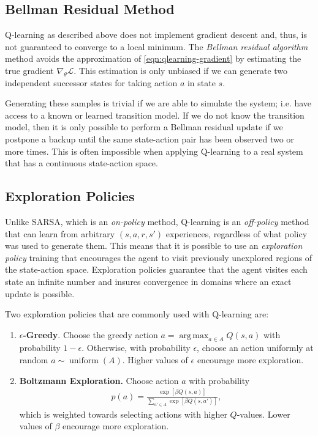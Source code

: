 \documentclass[11pt]{article}
\numberwithin{equation}{section}
\numberwithin{figure}{section}
\DeclareMathOperator*{\argmax}{arg\,max}
\DeclareMathOperator{\uniform}{uniform}
\begin{document}
\subsection{Bellman Residual Method}
Q-learning as described above does not implement gradient descent and, thus, is
not guaranteed to converge to a local minimum. The \emph{Bellman residual
algorithm} method avoids the approximation of \cref{eqn:qlearning-gradient} by
estimating the true gradient $\nabla_\theta \mathcal{L}$. This estimation is
only unbiased if we can generate two independent successor states for taking
action $a$ in state $s$.

Generating these samples is trivial if we are able to simulate the system; i.e.
have access to a known or learned transition model. If we do not know the
transition model, then it is only possible to perform a Bellman residual update
if we postpone a backup until the same state-action pair has been observed two
or more times. This is often impossible when applying Q-learning to a real system
that has a continuous state-action space.


\subsection{Exploration Policies}
Unlike SARSA, which is an \emph{on-policy} method,  Q-learning is an
\emph{off-policy} method that can learn from arbitrary $(s, a, r, s')$
experiences, regardless of what policy was used to generate them. This means
that it is possible to use an \emph{exploration policy} training that
encourages the agent to visit previously unexplored regions of the state-action
space. Exploration policies guarantee that the agent visites each state an
infinite number and insures convergence in domains where an exact update is
possible.

Two exploration policies that are commonly used with Q-learning are:
\begin{enumerate}
    \item \textbf{$\epsilon$-Greedy}. Choose the greedy action $a = \argmax_{a
        \in A} Q(s, a)$ with probability $1 - \epsilon$. Otherwise, with probability
        $\epsilon$, choose an action uniformly at random $a \sim \uniform(A)$. Higher
        values of $\epsilon$ encourage more exploration.
    \item \textbf{Boltzmann Exploration.} Choose action $a$ with probability
        \begin{align*}
            p(a) = \frac{\exp\left[ \beta Q(s, a) \right]}
                        {\sum_{a' \in A} \exp\left[ \beta Q(s, a') \right]},
        \end{align*}
        which is weighted towards selecting actions with higher $Q$-values. Lower
        values of $\beta$ encourage more exploration.
\end{enumerate}
\end{document}
